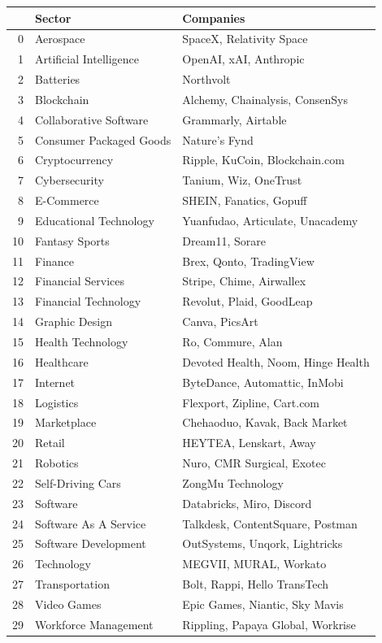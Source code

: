 \documentclass[a4paper,12pt]{article}
\begin{document}
\begin{table}[htbp]
\label{}
\centering
\begin{tabular}{rll}
 & Sector & Companies\\
\hline
0 & Aerospace & SpaceX, Relativity Space\\
1 & Artificial Intelligence & OpenAI, xAI, Anthropic\\
2 & Batteries & Northvolt\\
3 & Blockchain & Alchemy, Chainalysis, ConsenSys\\
4 & Collaborative Software & Grammarly, Airtable\\
5 & Consumer Packaged Goods & Nature's Fynd\\
6 & Cryptocurrency & Ripple, KuCoin, Blockchain.com\\
7 & Cybersecurity & Tanium, Wiz, OneTrust\\
8 & E-Commerce & SHEIN, Fanatics, Gopuff\\
9 & Educational Technology & Yuanfudao, Articulate, Unacademy\\
10 & Fantasy Sports & Dream11, Sorare\\
11 & Finance & Brex, Qonto, TradingView\\
12 & Financial Services & Stripe, Chime, Airwallex\\
13 & Financial Technology & Revolut, Plaid, GoodLeap\\
14 & Graphic Design & Canva, PicsArt\\
15 & Health Technology & Ro, Commure, Alan\\
16 & Healthcare & Devoted Health, Noom, Hinge Health\\
17 & Internet & ByteDance, Automattic, InMobi\\
18 & Logistics & Flexport, Zipline, Cart.com\\
19 & Marketplace & Chehaoduo, Kavak, Back Market\\
20 & Retail & HEYTEA, Lenskart, Away\\
21 & Robotics & Nuro, CMR Surgical, Exotec\\
22 & Self-Driving Cars & ZongMu Technology\\
23 & Software & Databricks, Miro, Discord\\
24 & Software As A Service & Talkdesk, ContentSquare, Postman\\
25 & Software Development & OutSystems, Unqork, Lightricks\\
26 & Technology & MEGVII, MURAL, Workato\\
27 & Transportation & Bolt, Rappi, Hello TransTech\\
28 & Video Games & Epic Games, Niantic, Sky Mavis\\
29 & Workforce Management & Rippling, Papaya Global, Workrise\\
\end{tabular}
\end{table}
\end{document}
